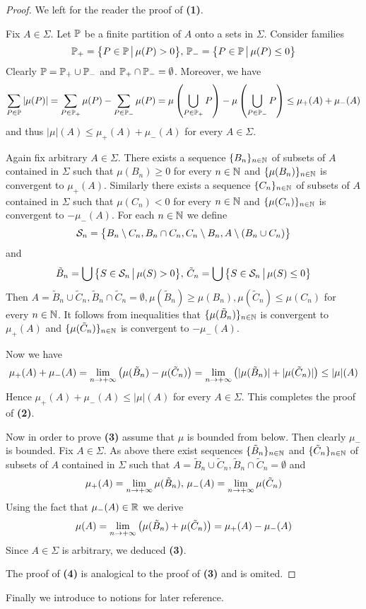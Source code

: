 \begin{proof}
    We left for the reader the proof of \textbf{(1)}.

    Fix $A \in \Sigma$. Let ${\mathbb P}$ be a finite partition of $A$ onto a sets in $\Sigma$. Consider families
    $${\mathbb P}_+ = \big\{P\in {\mathbb P}\,\big|\,\mu(P) > 0\big\},\,{\mathbb P}_- = \big\{P\in {\mathbb P}\,\big|\,\mu(P) \leq 0\big\}$$
    Clearly ${\mathbb P} = {\mathbb P}_+ \cup {\mathbb P}_-$ and ${\mathbb P}_+ \cap {\mathbb P}_- = \emptyset$. Moreover, we have
    $$\sum_{P\in {\mathbb P}}|\mu(P)| = \sum_{P \in {\mathbb P}_+}\mu(P) - \sum_{P \in {\mathbb P}_-}\mu(P) = \mu\left(\bigcup_{P\in {\mathbb P}_+}P\right) - \mu\left(\bigcup_{P\in {\mathbb P}_-}P\right) \leq \mu_+(A) + \mu_-(A)$$
    and thus $|\mu|(A) \leq \mu_+(A) + \mu_-(A)$ for every $A \in \Sigma$.

    Again fix arbitrary $A \in \Sigma$. There exists a sequence $\{B_n\}_{n\in {\mathbb N}}$ of subsets of $A$ contained in $\Sigma$ such that $\mu(B_n) \geq 0$ for every $n\in {\mathbb N}$ and $\{\mu(B_n)\}_{n\in {\mathbb N}}$ is convergent to $\mu_+(A)$. Similarly there exists a sequence $\{C_n\}_{n\in {\mathbb N}}$ of subsets of $A$ contained in $\Sigma$ such that $\mu(C_n) < 0$ for every $n \in {\mathbb N}$ and $\{\mu(C_n)\}_{n\in {\mathbb N}}$ is convergent to $-\mu_-(A)$. For each $n\in {\mathbb N}$ we define
    $${\mathcal S}_n = \big\{B_n\setminus C_n,B_n \cap C_n,C_n \setminus B_n, A \setminus (B_n\cup C_n) \big\}$$
    and
    $$\tilde{B}_n = \bigcup\big\{S\in {\mathcal S}_n\,\big|\,\mu(S) > 0\big\},\,\tilde{C}_n = \bigcup\big\{S\in {\mathcal S}_n\,\big|\,\mu(S) \leq 0\big\}$$
    Then $A = \tilde{B}_n\cup \tilde{C}_n,\tilde{B}_n\cap \tilde{C}_n = \emptyset,\mu(\tilde{B}_n) \geq \mu(B_n),\mu(\tilde{C}_n) \leq \mu(C_n)$ for every $n \in {\mathbb N}$. It follows from inequalities that $\{\mu(\tilde{B}_n)\}_{n\in {\mathbb N}}$ is convergent to $\mu_+(A)$ and $\{\mu(\tilde{C}_n)\}_{n\in {\mathbb N}}$ is convergent to $-\mu_-(A)$.

    Now we have
    $$\mu_+(A) + \mu_-(A) = \lim_{n\rightarrow +\infty}\left(\mu(\tilde{B}_n) - \mu(\tilde{C}_n)\right) = \lim_{n\rightarrow +\infty}\left(|\mu(\tilde{B}_n)| + |\mu(\tilde{C}_n)|\right) \leq |\mu|(A)$$
    Hence $\mu_+(A) + \mu_-(A) \leq |\mu|(A)$ for every $A \in \Sigma$. This completes the proof of \textbf{(2)}.

    Now in order to prove \textbf{(3)} assume that $\mu$ is bounded from below. Then clearly $\mu_-$ is bounded. Fix $A \in \Sigma$. As above there exist sequences $\{\tilde{B}_n\}_{n\in {\mathbb N}}$ and $\{\tilde{C}_n\}_{n\in {\mathbb N}}$ of subsets of $A$ contained in $\Sigma$ such that $A = \tilde{B}_n\cup \tilde{C}_n,\tilde{B}_n\cap \tilde{C}_n = \emptyset$ and
    $$\mu_+(A) = \lim_{n\rightarrow +\infty} \mu(\tilde{B}_n),\,\mu_-(A) = \lim_{n\rightarrow +\infty}\mu(\tilde{C}_n)$$
    Using the fact that $\mu_-(A) \in {\mathbb R}$ we derive
    $$\mu(A) = \lim_{n\rightarrow +\infty}\left(\mu(\tilde{B}_n) + \mu(\tilde{C}_n)\right) = \mu_+(A) - \mu_-(A)$$
    Since $A \in \Sigma$ is arbitrary, we deduced \textbf{(3)}.

    The proof of \textbf{(4)} is analogical to the proof of \textbf{(3)} and is omited.
\end{proof}
\noindent
Finally we introduce to notions for later reference.

